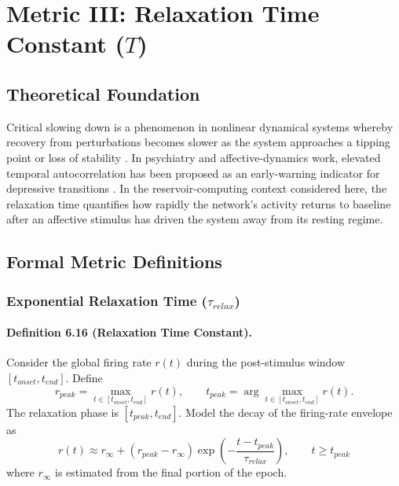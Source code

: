 \section{Metric III: Relaxation Time Constant ($T$)}
\label{sec:dynamics_tau}

\subsection{Theoretical Foundation}

Critical slowing down is a phenomenon in nonlinear dynamical systems whereby recovery from perturbations becomes slower as the system approaches a tipping point or loss of stability \cite{scheffer_early-warning_2009}. In psychiatry and affective-dynamics work, elevated temporal autocorrelation has been proposed as an early-warning indicator for depressive transitions \cite{vandeleemput_critical_2014,wichers_critical_2016}. In the reservoir-computing context considered here, the relaxation time quantifies how rapidly the network's activity returns to baseline after an affective stimulus has driven the system away from its resting regime.

\subsection{Formal Metric Definitions}

\subsubsection{Exponential Relaxation Time ($\tau_{relax}$)}

\paragraph{Definition 6.16 (Relaxation Time Constant).}
Consider the global firing rate $r(t)$ during the post-stimulus window $[t_{onset},t_{end}]$. Define
\begin{equation}
r_{peak}=\max_{t\in[t_{onset},t_{end}]} r(t), \qquad t_{peak}=\arg\max_{t\in[t_{onset},t_{end}]} r(t).
\end{equation}
The relaxation phase is $[t_{peak},t_{end}]$. Model the decay of the firing-rate envelope as
\begin{equation}
r(t) \approx r_{\infty} + (r_{peak}-r_{\infty})\exp\left(-\frac{t-t_{peak}}{\tau_{relax}}\right), \qquad t\ge t_{peak}
\end{equation}
where $r_{\infty}$ is estimated from the final portion of the epoch.

